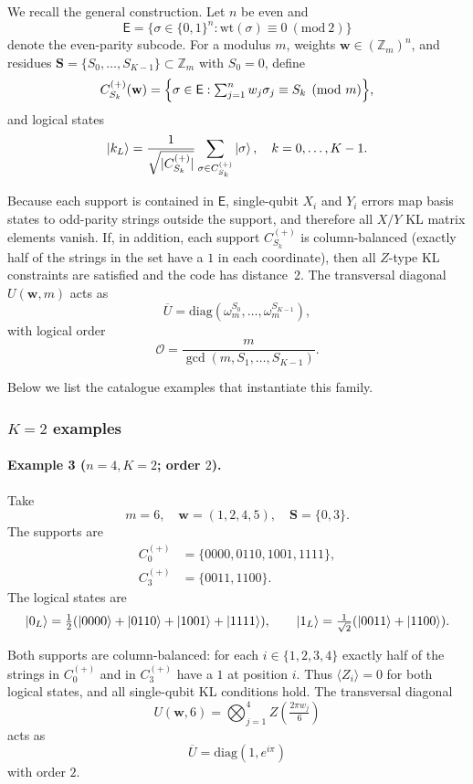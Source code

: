 \documentclass[pdflatex,sn-nature]{sn-jnl}%
\theoremstyle{thmstyleone}%
\theoremstyle{thmstyletwo}%
\theoremstyle{thmstylethree}%
\begin{document}
\begin{appendices}
We recall the general construction. 
Let $n$ be even and
\[
  \mathsf E=\{\sigma\in\{0,1\}^n:\mathrm{wt}(\sigma)\equiv 0\ (\mathrm{mod}\ 2)\}
\]
denote the even-parity subcode. 
For a modulus $m$, weights $\mathbf w\in(\mathbb Z_m)^n$, and residues
$\mathbf S=\{S_0,\dots,S_{K-1}\}\subset\mathbb Z_m$ with $S_0=0$, define
\[
  C^{(+)}_{S_k}(\mathbf w)
  =\Bigl\{\sigma\in\mathsf E:\textstyle\sum_{j=1}^n w_j\sigma_j\equiv S_k\pmod m\Bigr\},
\]
and logical states
\[
  \ket{k_L}=\frac{1}{\sqrt{|C^{(+)}_{S_k}|}}
    \sum_{\sigma\in C^{(+)}_{S_k}}\ket{\sigma},\quad k=0,\dots,K-1.
\]

Because each support is contained in $\mathsf E$, single-qubit $X_i$ and $Y_i$ errors map basis states to odd-parity strings outside the support, and therefore all $X/Y$ KL matrix elements vanish. If, in addition, each support $C^{(+)}_{S_k}$ is column-balanced (exactly half of the strings in the set have a $1$ in each coordinate), then all $Z$-type KL constraints are satisfied and the code has distance~2. The transversal diagonal $U(\mathbf w,m)$ acts as
\[
  \overline U=\mathrm{diag}(\omega_m^{S_0},\dots,\omega_m^{S_{K-1}}),
\]
with logical order
\[
  \mathcal O=\frac{m}{\gcd(m,S_1,\dots,S_{K-1})}.
\]

Below we list the catalogue examples that instantiate this family.

\subsubsection{$K=2$ examples}

\paragraph{Example 3 ($n=4,K=2$; order $2$).}
Take
\[
  m=6,\quad \mathbf w=(1,2,4,5),\quad \mathbf S=\{0,3\}.
\]
The supports are
\[
  \begin{aligned}
      C^{(+)}_{0} & =\{0000,0110,1001,1111\}, \\
      C^{(+)}_{3} & =\{0011,1100\}.
  \end{aligned}
\]
The logical states are
\[
  \ket{0_L}=\tfrac12(\ket{0000}+\ket{0110}+\ket{1001}+\ket{1111}),\qquad
  \ket{1_L}=\tfrac{1}{\sqrt2}(\ket{0011}+\ket{1100}).
\]

Both supports are column-balanced: for each $i\in\{1,2,3,4\}$ exactly half of the strings in $C^{(+)}_0$ and in $C^{(+)}_3$ have a $1$ at position $i$. Thus $\langle Z_i\rangle=0$ for both logical states, and all single-qubit KL conditions hold. The transversal diagonal
\[
  U(\mathbf w,6)=\bigotimes_{j=1}^4 Z\!\left(\tfrac{2\pi w_j}{6}\right)
\]
acts as
\[
  \overline U=\mathrm{diag}(1,e^{i\pi})
\]
with order $2$.


\end{appendices}
\end{document}

